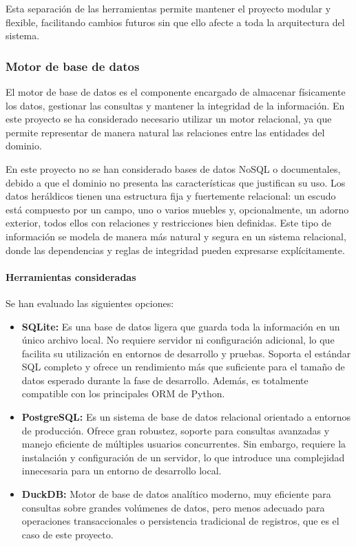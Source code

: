 Esta separación de las herramientas permite mantener el proyecto modular y flexible, facilitando cambios futuros sin
que ello afecte a toda la arquitectura del sistema.

\subsubsection{Motor de base de datos}
El motor de base de datos es el componente encargado de almacenar físicamente los datos, gestionar las consultas y
mantener la integridad de la información. En este proyecto se ha considerado necesario utilizar un motor relacional,
ya que permite representar de manera natural las relaciones entre las entidades del dominio.

En este proyecto no se han considerado bases de datos NoSQL o documentales, debido a que el dominio no presenta las 
características que justifican su uso. Los datos heráldicos tienen una estructura fija y fuertemente relacional: 
un escudo está compuesto por un campo, uno o varios muebles y, opcionalmente, un adorno exterior, todos ellos con 
relaciones y restricciones bien definidas. Este tipo de información se modela de manera más natural y segura en un 
sistema relacional, donde las dependencias y reglas de integridad pueden expresarse explícitamente.

\paragraph{Herramientas consideradas}
Se han evaluado las siguientes opciones:

\begin{itemize}
    \item \textbf{SQLite:} Es una base de datos ligera que guarda toda la información en un único archivo local. 
    No requiere servidor ni configuración adicional, lo que facilita su utilización en entornos de desarrollo y pruebas.
    Soporta el estándar SQL completo y ofrece un rendimiento más que suficiente para el tamaño de datos esperado
    durante la fase de desarrollo. Además, es totalmente compatible con los principales ORM de Python.

    \item \textbf{PostgreSQL:} Es un sistema de base de datos relacional orientado a entornos de producción.
    Ofrece gran robustez, soporte para consultas avanzadas y manejo eficiente de múltiples usuarios concurrentes.
    Sin embargo, requiere la instalación y configuración de un servidor, lo que introduce una complejidad innecesaria
    para un entorno de desarrollo local.

    \item \textbf{DuckDB:} Motor de base de datos analítico moderno, muy eficiente para consultas sobre grandes volúmenes
    de datos, pero menos adecuado para operaciones transaccionales o persistencia tradicional de registros, que es
    el caso de este proyecto.
\end{itemize}

